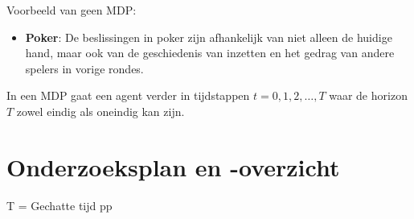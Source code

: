 \documentclass[a4paper,12pt]{article}
\begin{document}
Voorbeeld van geen MDP:
\begin{itemize}
    \item \textbf{Poker}: De beslissingen in poker zijn afhankelijk van niet alleen de huidige hand, maar ook van de geschiedenis van inzetten en het gedrag van andere spelers in vorige rondes.
\end{itemize}

In een MDP gaat een agent verder in tijdstappen \(t = 0, 1, 2, \ldots, T\) waar
de horizon \(T\) zowel eindig als oneindig kan zijn.

\section{Onderzoeksplan en -overzicht}

T = Gechatte tijd pp \\ \small
\end{document}
